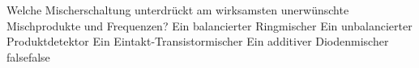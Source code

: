     {Welche Mischerschaltung unterdrückt am wirksamsten unerwünschte Mischprodukte und Frequenzen?}
    {Ein balancierter Ringmischer}
    {Ein unbalancierter Produktdetektor}
    {Ein Eintakt-Transistormischer}
    {Ein additiver Diodenmischer}
    {false}{false}